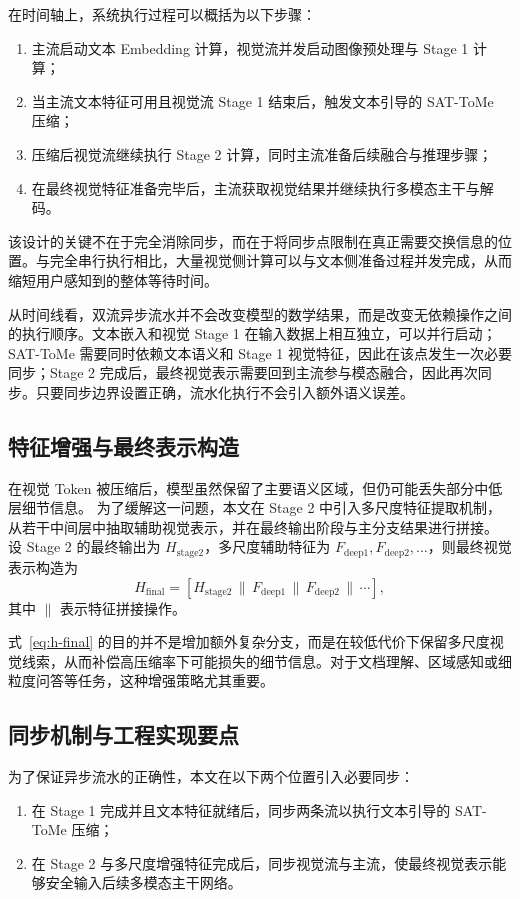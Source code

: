 在时间轴上，系统执行过程可以概括为以下步骤：
\begin{enumerate}
\item 主流启动文本 Embedding 计算，视觉流并发启动图像预处理与 Stage 1 计算；
\item 当主流文本特征可用且视觉流 Stage 1 结束后，触发文本引导的 SAT-ToMe 压缩；
\item 压缩后视觉流继续执行 Stage 2 计算，同时主流准备后续融合与推理步骤；
\item 在最终视觉特征准备完毕后，主流获取视觉结果并继续执行多模态主干与解码。
\end{enumerate}

该设计的关键不在于完全消除同步，而在于将同步点限制在真正需要交换信息的位置。与完全串行执行相比，大量视觉侧计算可以与文本侧准备过程并发完成，从而缩短用户感知到的整体等待时间。

从时间线看，双流异步流水并不会改变模型的数学结果，而是改变无依赖操作之间的执行顺序。文本嵌入和视觉 Stage 1 在输入数据上相互独立，可以并行启动；SAT-ToMe 需要同时依赖文本语义和 Stage 1 视觉特征，因此在该点发生一次必要同步；Stage 2 完成后，最终视觉表示需要回到主流参与模态融合，因此再次同步。只要同步边界设置正确，流水化执行不会引入额外语义误差。

\subsection{特征增强与最终表示构造}
在视觉 Token 被压缩后，模型虽然保留了主要语义区域，但仍可能丢失部分中低层细节信息。
为了缓解这一问题，本文在 Stage 2 中引入多尺度特征提取机制，从若干中间层中抽取辅助视觉表示，并在最终输出阶段与主分支结果进行拼接。
设 Stage 2 的最终输出为 $H_{\mathrm{stage2}}$，多尺度辅助特征为 $F_{\mathrm{deep1}}, F_{\mathrm{deep2}}, \ldots$，则最终视觉表示构造为
\begin{equation}
H_{\mathrm{final}} = \left[ H_{\mathrm{stage2}} \,\|\, F_{\mathrm{deep1}} \,\|\, F_{\mathrm{deep2}} \,\|\, \cdots \right],
\label{eq:h-final}
\end{equation}
其中 $\|$ 表示特征拼接操作。

式~\eqref{eq:h-final} 的目的并不是增加额外复杂分支，而是在较低代价下保留多尺度视觉线索，从而补偿高压缩率下可能损失的细节信息。对于文档理解、区域感知或细粒度问答等任务，这种增强策略尤其重要。

\subsection{同步机制与工程实现要点}
为了保证异步流水的正确性，本文在以下两个位置引入必要同步：
\begin{enumerate}
\item 在 Stage 1 完成并且文本特征就绪后，同步两条流以执行文本引导的 SAT-ToMe 压缩；
\item 在 Stage 2 与多尺度增强特征完成后，同步视觉流与主流，使最终视觉表示能够安全输入后续多模态主干网络。
\end{enumerate}

